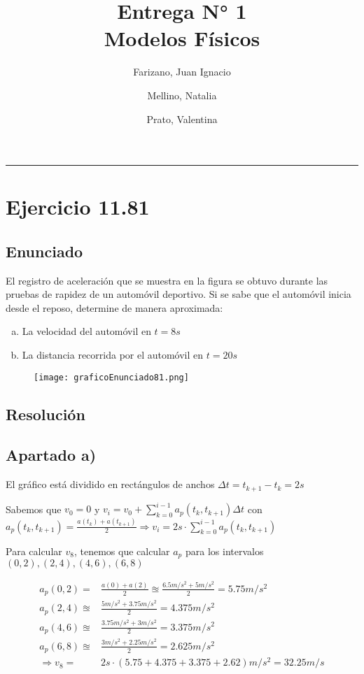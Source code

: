 \documentclass[11pt]{article}
\title{
  Entrega N° 1 \\
  \large Modelos Físicos
}
\author{
  Farizano, Juan Ignacio \\
  \and
  Mellino, Natalia \\
  \and
  Prato, Valentina
}
\date{}
\begin{document}
\maketitle
\noindent\rule{\textwidth}{1pt}

\section*{Ejercicio 11.81}

\subsection*{Enunciado}

El registro de aceleración que se muestra en la figura se obtuvo
durante las pruebas de rapidez de un automóvil deportivo. Si se sabe que
el automóvil inicia desde el reposo, determine de manera aproximada:
\begin{enumerate}[a)]
  \item La velocidad del automóvil en $t = 8s$
  \item La distancia recorrida por el automóvil en $t = 20s$
\end{enumerate}

\begin{figure}[h!]
  \begin{center}
    \texttt{[image: graficoEnunciado81.png]}
  \end{center}
\end{figure}

\subsection*{Resolución}

\subsection*{Apartado a)}
El gráfico está dividido en rectángulos de anchos $\Delta t = t_{k+1}-t_k = 2s$

Sabemos que $v_0 = 0$ y $v_i = v_0 + \displaystyle\sum_{k = 0}^{i - 1} a_p(t_k, t_{k + 1}) \Delta t$ con
$a_p(t_k, t_{k + 1}) = \frac{a(t_k) + a(t_{k+1})}{2} \Rightarrow v_i = 2s \cdot \displaystyle\sum_{k = 0}^{i - 1} a_p(t_k, t_{k + 1})$

Para calcular $v_8$, tenemos que calcular $a_p$ para los intervalos
$(0, 2), (2, 4), (4, 6), (6,8)$

\begin{align*}
  a_p(0, 2) =& \frac{a(0)+ a(2)}{2} \approxeq \frac{6.5m/s^2 + 5m/s^2}{2} = 5.75m/s^2\\
  a_p(2, 4) \approxeq& \frac{5m/s^2 + 3.75m/s^2}{2} = 4.375m/s^2 \\
  a_p(4, 6) \approxeq& \frac{3.75m/s^2 + 3m/s^2}{2} = 3.375m/s^2 \\
  a_p(6, 8) \approxeq& \frac{3m/s^2 + 2.25m/s^2}{2} = 2.625m/s^2 \\
  \Rightarrow v_8 =& 2s \cdot (5.75 + 4.375 + 3.375 + 2.62)m/s^2 = 32.25m/s
\end{align*}
\end{document}
